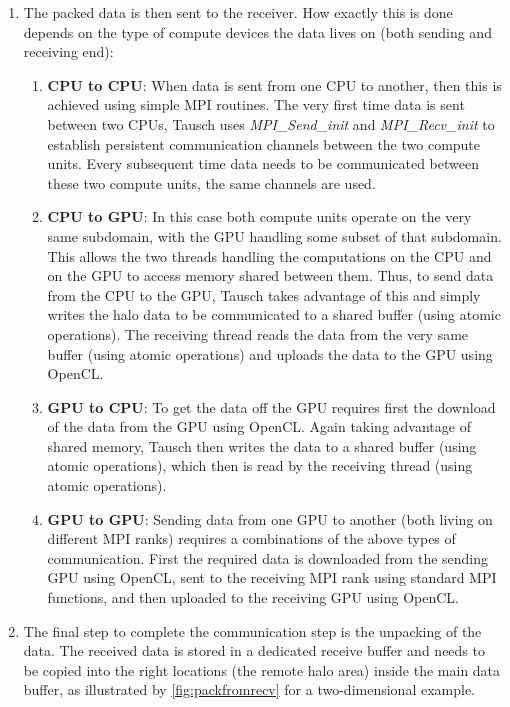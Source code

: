 \documentclass{article}
\begin{document}
\begin{enumerate}
    \item The packed data is then sent to the receiver. How exactly this is done depends on the type of compute devices the data lives on (both sending and receiving end):
        \begin{enumerate}
            \item \textbf{CPU to CPU}: When data is sent from one CPU to another, then this is achieved using simple MPI routines. The very first time data is sent between two CPUs, Tausch uses \emph{MPI\_Send\_init} and \emph{MPI\_Recv\_init} to establish persistent communication channels between the two compute units. Every subsequent time data needs to be communicated between these two compute units, the same channels are used.
            \item \textbf{CPU to GPU}: In this case both compute units operate on the very same subdomain, with the GPU handling some subset of that subdomain. This allows the two threads handling the computations on the CPU and on the GPU to access memory shared between them. Thus, to send data from the CPU to the GPU, Tausch takes advantage of this and simply writes the halo data to be communicated to a shared buffer (using atomic operations). The receiving thread reads the data from the very same buffer (using atomic operations) and uploads the data to the GPU using OpenCL.
            \item \textbf{GPU to CPU}: To get the data off the GPU requires first the download of the data from the GPU using OpenCL. Again taking advantage of shared memory, Tausch then writes the data to a shared buffer (using atomic operations), which then is read by the receiving thread (using atomic operations).
            \item \textbf{GPU to GPU}: Sending data from one GPU to another (both living on different MPI ranks) requires a combinations of the above types of communication. First the required data is downloaded from the sending GPU using OpenCL, sent to the receiving MPI rank using standard MPI functions, and then uploaded to the receiving GPU using OpenCL.
        \end{enumerate}
    \item The final step to complete the communication step is the unpacking of the data. The received data is stored in a dedicated receive buffer and needs to be copied into the right locations (the remote halo area) inside the main data buffer, as illustrated by \autoref{fig:packfromrecv} for a two-dimensional example.
        \begin{figure}[ht]\centering
\end{figure}
\end{enumerate}
\end{document}
